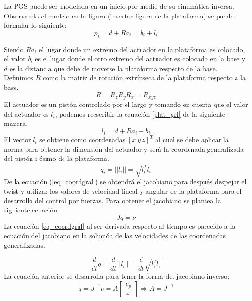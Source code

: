 La PGS puede ser modelada en un inicio por medio de su cinemática inversa. Observando el modelo en la figura (insertar figura de la plataforma) se puede formular lo siguiente:
\begin{equation} \label{plat_grl}
p_i = d + Ra_i = b_i + l_i
\end{equation}

Siendo $Ra_i$ el lugar donde un extremo del actuador en la plataforma es colocado, el valor $b_i$ es el lugar donde el otro extremo del actuador es colocado en la base y $d$ es la distancia que debe de moverse la plataforma respecto de la base. Definimos $R$ como la matriz de rotación extrínseca de la plataforma respecto a la base. 
\begin{equation}
R = R_zR_yR_x = R_{xyz}
\end{equation}
El actuador es un pistón controlado por el largo y tomando en cuenta que el valor del actuador es $l_i$, podemos reescribir la ecuación \ref{plat_grl} de la siguiente manera.
\begin{equation}
l_i = d + Ra_i - b_i
\end{equation}
El vector $l_i$ se obtiene como coordenadas $[x\ y\ z]^T$ al cual se debe aplicar la norma para obtener la dimensión del actuador y será la coordenada generalizada del pistón i-ésimo de la plataforma.
\begin{equation}\label{eq_coordgral}
q_i = ||l_i|| = \sqrt{l_i^Tl_i}
\end{equation}
De la ecuación (\ref{eq_coordgral}) se obtendrá el jacobiano para después despejar el twist y utilizar los valores de velocidad lineal y angular de la plataforma para el desarrollo del control por fuerzas. Para obtener el jacobiano se plantea la siguiente ecuación
\begin{equation} \label{equgral_q}
J\dot{q}=\nu
\end{equation}
La ecuación \ref{eq_coordgral} al ser derivada respecto al tiempo es parecido a la ecuación del jacobiano en la solución de las velocidades de las coordenadas generalizadas.

\begin{equation}
\frac{d}{dt}q = \frac{d}{dt}||l_i|| = \frac{d}{dt}\sqrt{l_i^Tl_i} 
\end{equation}
La ecuación anterior se desarrolla para tener la forma del jacobiano inverso:
\begin{equation}
\dot{q}=J^{-1} \nu = A \begin{bmatrix}
v_p\\
\omega
\end{bmatrix} \Rightarrow A = J^{-1}
\end{equation}

